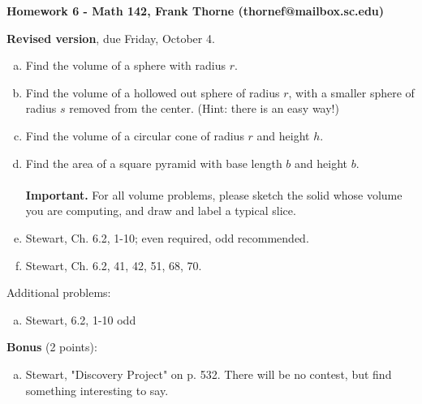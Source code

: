 \documentclass[12pt]{article}
\begin{document}
\setlength{\topmargin}{-2mm}





\begin{center}{\bf Homework 6 - Math 142, Frank Thorne (thornef@mailbox.sc.edu)}
\end{center}
\begin{center}
{\bf Revised version}, due Friday, October 4.
\end{center}

\begin{enumerate}[(a)]
\item
Find the volume of a sphere with radius $r$.

\item
Find the volume of a hollowed out sphere of radius $r$, with a smaller sphere
of radius $s$ removed from the center. (Hint: there is an easy way!)

\item
Find the volume of a circular cone of radius $r$ and height $h$.

\item
Find the area of a square pyramid with base length $b$ and height $b$.
\\
\\
{\bf Important.} For all volume problems, please sketch the solid whose volume
you are computing, and draw and label a typical slice.
\item
Stewart, Ch. 6.2, 1-10; even required, odd recommended.

\item
Stewart, Ch. 6.2, 41, 42, 51, 68, 70.
\end{enumerate}
Additional problems:

\begin{enumerate}[(a)]
\item
Stewart, 6.2, 1-10 odd%
\end{enumerate}
{\bf Bonus} (2 points):
\begin{enumerate}[(a)]
\item
Stewart, "Discovery Project" on p. 532. There will be no contest, but find something interesting
to say.
\end{enumerate}
\end{document}
